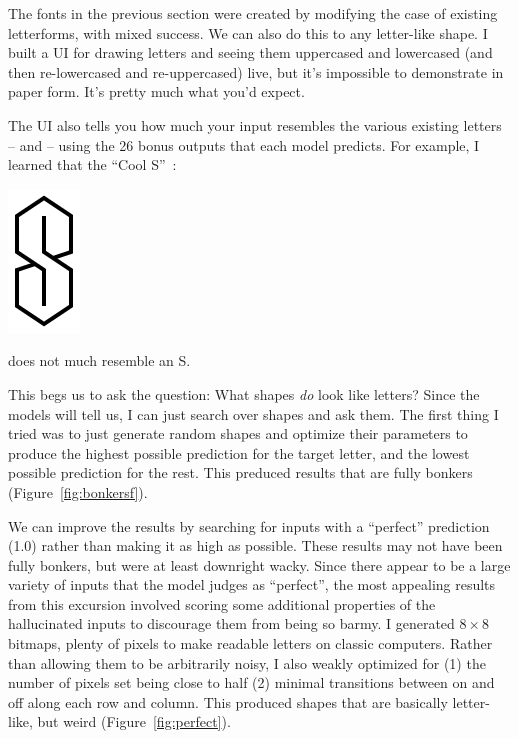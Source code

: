 \documentclass[twocolumn]{article}
\begin{document}
The fonts in the previous section were created by modifying the case
of existing letterforms, with mixed success. We can also do this to
any letter-like shape. I built a UI for drawing letters and seeing
them uppercased and lowercased (and then re-lowercased and
re-uppercased) live, but it's impossible to demonstrate in paper form.
It's pretty much what you'd expect.

The UI also tells you how much your input resembles the various
existing letters -- and
-- using the 26 bonus outputs that each
model predicts. For example, I learned that the ``Cool
S''~\cite{wikipediacools}:

\begin{center}
\includegraphics[width=0.1 \linewidth]{cools}
\end{center}

\noindent does not much resemble an S.

This begs us to ask the question: What shapes {\em do} look like
letters? Since the models will tell us, I can just search over shapes
and ask them. The first thing I tried was to just generate random
shapes and optimize their parameters to produce the highest possible
prediction for the target letter, and the lowest possible prediction
for the rest. This preduced results that are fully bonkers
(Figure~\ref{fig:bonkersf}). 

We can improve the results by searching for inputs with a ``perfect''
prediction (1.0) rather than making it as high as possible. These
results may not have been fully bonkers, but were at least downright
wacky. Since there appear to be a large variety of inputs that the
model judges as ``perfect'', the most appealing results from this
excursion involved scoring some additional properties of the
hallucinated inputs to discourage them from being so barmy. I
generated $8 \times 8$ bitmaps, plenty of pixels to make readable
letters on classic computers. Rather than allowing them to be
arbitrarily noisy, I also weakly optimized for (1) the number of
pixels set being close to half (2) minimal transitions between
on and off along each row and column. This produced shapes that
are basically letter-like, but weird (Figure~\ref{fig:perfect}).
\end{document}
